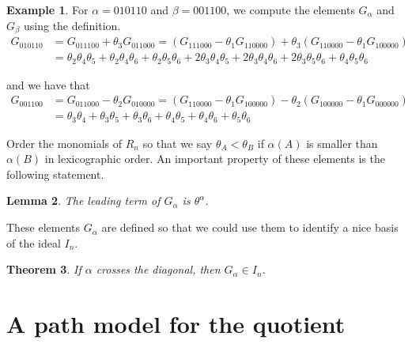 \documentclass[11pt]{amsart}
\newtheorem{theorem}{Theorem}[section]
\newtheorem{lemma}[theorem]{Lemma}
\theoremstyle{definition}
\newtheorem{example}[theorem]{Example}
\numberwithin{equation}{section}
\begin{document}
\begin{example} For $\alpha = 010110$ and $\beta = 001100$, we compute
the elements $G_\alpha$ and $G_\beta$ using the definition.
\begin{align*}
G_{010110} &= G_{011100} + \theta_3 G_{011000} = (G_{111000} - \theta_1 G_{110000})
+ \theta_3(G_{110000} - \theta_1 G_{100000})\\
&= \theta_2 \theta_4 \theta_5 + \theta_2 \theta_4 \theta_6 + \theta_2 \theta_5 \theta_6
+ 2 \theta_3 \theta_4 \theta_5 + 2 \theta_3 \theta_4 \theta_6 + 2 \theta_3 \theta_5 \theta_6
+ \theta_4 \theta_5 \theta_6
\end{align*}

and we have that
\begin{align*}
G_{001100} &= G_{011000} - \theta_2 G_{010000} = (G_{110000} - \theta_1 G_{100000})
- \theta_2 (G_{100000} - \theta_1 G_{000000})\\
&= \theta_3 \theta_4 + \theta_3 \theta_5 + \theta_3 \theta_6 + \theta_4 \theta_5 + \theta_4 \theta_6 + \theta_5 \theta_6
\end{align*}
\end{example}

Order the monomials of $R_n$ so that we say $\theta_A < \theta_B$ if
$\alpha(A)$ is smaller than $\alpha(B)$ in lexicographic order.
An important property of these elements is the following statement.

\begin{lemma}
The leading term of $G_\alpha$ is $\theta^\alpha$.
\end{lemma}

These elements $G_\alpha$ are defined so that we could use them to
identify a nice basis of the ideal $I_n$.

\begin{theorem}
If $\alpha$ crosses the diagonal, then $G_\alpha \in I_n$.
\end{theorem}

\section{A path model for the quotient}
\end{document}
